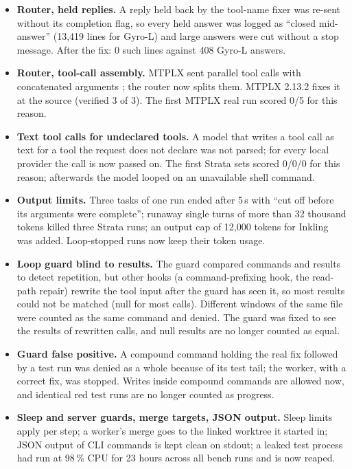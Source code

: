 \begin{itemize}
\item \textbf{Router, held replies.} A reply held back by the tool-name fixer was re-sent without its completion
flag, so every held answer was logged as ``closed mid-answer'' (13,419 lines for Gyro-L) and large answers were cut
without a stop message. After the fix: 0 such lines against 408 Gyro-L answers.
\item \textbf{Router, tool-call assembly.} MTPLX sent parallel tool calls with concatenated arguments
\citep{MTPLX-2026ab}; the router now splits them. MTPLX 2.13.2 fixes it at the source (verified 3 of 3). The first
MTPLX real run scored 0/5 for this reason.
\item \textbf{Text tool calls for undeclared tools.} A model that writes a tool call as text for a tool the request does not
declare was not parsed; for every local provider the call is now passed on. The first Strata sets scored 0/0/0 for this
reason; afterwards the model looped on an unavailable shell command.
\item \textbf{Output limits.} Three tasks of one run ended after 5\,s with ``cut off before its arguments were complete'';
runaway single turns of more than 32 thousand tokens killed three Strata runs; an output cap of 12,000 tokens for Inkling
was added. Loop-stopped runs now keep their token usage.
\item \textbf{Loop guard blind to results.} The guard compared commands and results to detect repetition, but other hooks
(a command-prefixing hook, the read-path repair) rewrite the tool input after the guard has seen it, so most results could not be
matched (null for most calls). Different windows of the same file were counted as the same command and denied. The guard
was fixed to see the results of rewritten calls, and null results are no longer counted as equal.
\item \textbf{Guard false positive.} A compound command holding the real fix followed by a test run was denied as a whole
because of its test tail; the worker, with a correct fix, was stopped. Writes inside compound commands are allowed now, and
identical red test runs are no longer counted as progress.
\item \textbf{Sleep and server guards, merge targets, JSON output.} Sleep limits apply per step; a worker's merge goes to
the linked worktree it started in; JSON output of CLI commands is kept clean on stdout; a leaked test process had run at 98\,\% CPU for
23 hours across all bench runs and is now reaped.
\end{itemize}

